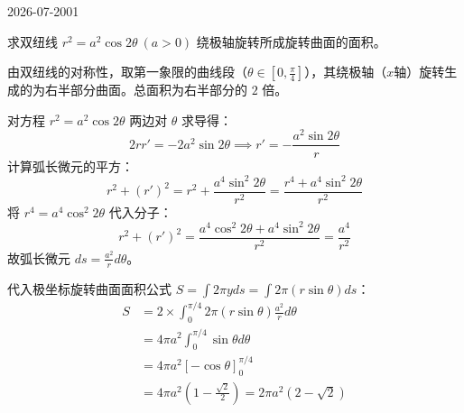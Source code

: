 \begin{mistake}{2026-07-20}{01}

\begin{problemcontent}
求双纽线 \(r^2 = a^2 \cos 2\theta \ (a > 0)\) 绕极轴旋转所成旋转曲面的面积。
\end{problemcontent}

\begin{solutioncontent}
由双纽线的对称性，取第一象限的曲线段（\(\theta \in [0, \frac{\pi}{4}]\)），其绕极轴（\(x\)轴）旋转生成的为右半部分曲面。总面积为右半部分的 \(2\) 倍。

对方程 \(r^2 = a^2 \cos 2\theta\) 两边对 \(\theta\) 求导得：
\[2r r' = -2a^2 \sin 2\theta \implies r' = -\frac{a^2 \sin 2\theta}{r}\]
计算弧长微元的平方：
\[r^2 + (r')^2 = r^2 + \frac{a^4 \sin^2 2\theta}{r^2} = \frac{r^4 + a^4 \sin^2 2\theta}{r^2}\]
将 \(r^4 = a^4 \cos^2 2\theta\) 代入分子：
\[r^2 + (r')^2 = \frac{a^4 \cos^2 2\theta + a^4 \sin^2 2\theta}{r^2} = \frac{a^4}{r^2}\]
故弧长微元 \(ds = \frac{a^2}{r} d\theta\)。

代入极坐标旋转曲面面积公式 \(S = \int 2\pi y ds = \int 2\pi (r \sin\theta) ds\)：
\[
\begin{aligned}
S &= 2 \times \int_{0}^{\pi/4} 2\pi (r \sin\theta) \frac{a^2}{r} d\theta \\
&= 4\pi a^2 \int_{0}^{\pi/4} \sin\theta d\theta \\
&= 4\pi a^2 \left[ -\cos\theta \right]_{0}^{\pi/4} \\
&= 4\pi a^2 \left( 1 - \frac{\sqrt{2}}{2} \right) = 2\pi a^2 (2 - \sqrt{2})
\end{aligned}
\]
\end{solutioncontent}


\end{mistake}
